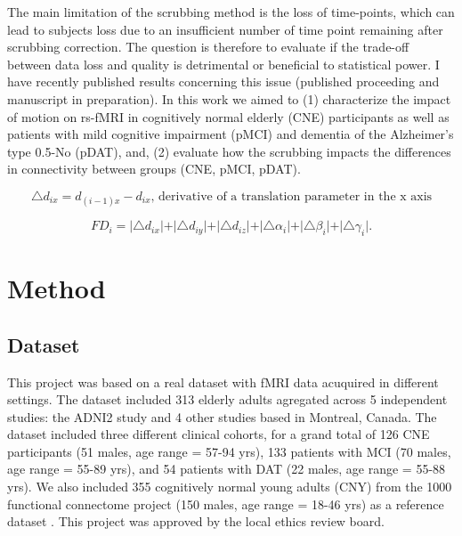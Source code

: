 The main limitation of the scrubbing method is the loss of time-points, which can lead to subjects loss due to an insufficient number of time point remaining after scrubbing correction. The question is therefore to evaluate if the trade-off between data loss and quality is detrimental or beneficial to statistical power. I have recently published results concerning this issue \cite{Dansereau2014} (published proceeding and manuscript in preparation). In this work we aimed to (1) characterize the impact of motion on rs-fMRI in cognitively normal elderly (CNE)  participants as well as patients with mild cognitive impairment (pMCI) and dementia of the Alzheimer's type 0.5-No (pDAT), and, (2) evaluate how the scrubbing impacts the differences in connectivity between groups (CNE, pMCI, pDAT).

\begin{equation}\label{Frame displacement} 
  \triangle d_{ix} = d_{(i-1)x} - d_{ix}\text{, derivative of a translation parameter in the x axis}
\end{equation}

\begin{equation}\label{Frame displacement}  
    FD_{i} = \vert \triangle d_{ix} \vert + \vert \triangle d_{iy} \vert + \vert \triangle d_{iz} \vert + \vert \triangle \alpha_{i} \vert + \vert \triangle \beta_{i} \vert + \vert \triangle \gamma_{i} \vert.  
\end{equation}

\section{Method}
\subsection{Dataset}
This project was based on a real dataset with fMRI data acuquired in different settings. The dataset included 313 elderly adults agregated across 5 independent studies: the ADNI2 study and 4 other studies based in Montreal, Canada. The dataset included three different clinical cohorts, for a grand total of 126 CNE participants (51 males, age range = 57-94 yrs), 133 patients with MCI (70 males, age range = 55-89 yrs), and 54 patients with DAT (22 males, age range = 55-88 yrs). We also included 355 cognitively normal young adults (CNY) from the 1000 functional connectome project (150 males, age range = 18-46 yrs) as a reference dataset \citep{Biswal2010}. This project was approved by the local ethics review board. 

